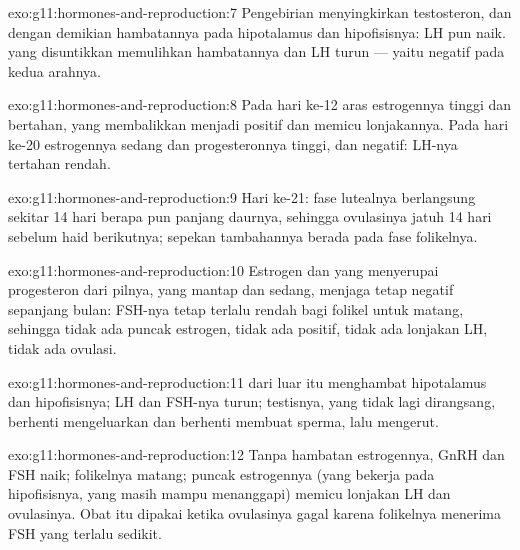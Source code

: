 \begin{solution}{exo:g11:hormones-and-reproduction:7}
Pengebirian menyingkirkan testosteron, dan dengan demikian hambatannya
pada hipotalamus dan hipofisisnya: LH pun naik.  yang
disuntikkan memulihkan hambatannya dan LH turun --- yaitu 
negatif pada kedua arahnya.
\end{solution}

\begin{solution}{exo:g11:hormones-and-reproduction:8}
Pada hari ke-12 aras estrogennya tinggi dan bertahan, yang membalikkan
 menjadi positif dan memicu lonjakannya. Pada hari ke-20
estrogennya sedang dan progesteronnya tinggi, dan 
negatif: LH-nya tertahan rendah.
\end{solution}

\begin{solution}{exo:g11:hormones-and-reproduction:9}
Hari ke-21: fase lutealnya berlangsung sekitar 14 hari berapa pun
panjang daurnya, sehingga ovulasinya jatuh 14 hari sebelum haid
berikutnya; sepekan tambahannya berada pada fase folikelnya.
\end{solution}

\begin{solution}{exo:g11:hormones-and-reproduction:10}
Estrogen dan  yang menyerupai progesteron dari pilnya, yang
mantap dan sedang, menjaga  tetap negatif sepanjang
bulan: FSH-nya tetap terlalu rendah bagi folikel untuk matang, sehingga
tidak ada puncak estrogen, tidak ada  positif, tidak ada
lonjakan LH, tidak ada ovulasi.
\end{solution}

\begin{solution}{exo:g11:hormones-and-reproduction:11}
 dari luar itu menghambat hipotalamus dan hipofisisnya; LH
dan FSH-nya turun; testisnya, yang tidak lagi dirangsang, berhenti
mengeluarkan  dan berhenti membuat sperma, lalu mengerut.
\end{solution}

\begin{solution}{exo:g11:hormones-and-reproduction:12}
Tanpa hambatan estrogennya, GnRH dan FSH naik; folikelnya matang;
puncak estrogennya (yang bekerja pada hipofisisnya, yang masih mampu
menanggapi) memicu lonjakan LH dan ovulasinya. Obat itu dipakai ketika
ovulasinya gagal karena folikelnya menerima FSH yang terlalu sedikit.
\end{solution}

